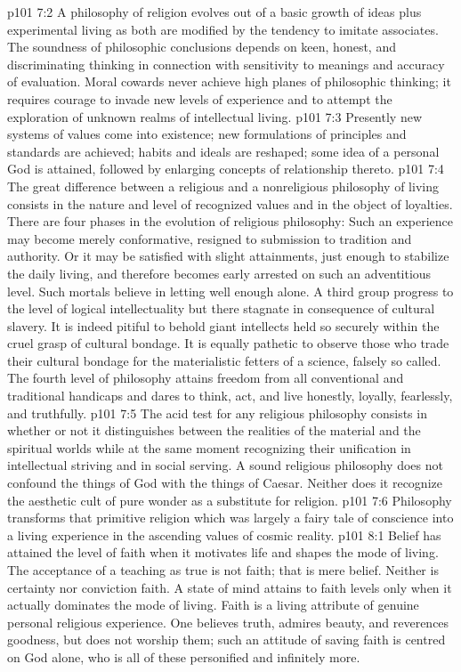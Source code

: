 \vs p101 7:2 A philosophy of religion evolves out of a basic growth of ideas plus experimental living as both are modified by the tendency to imitate associates. The soundness of philosophic conclusions depends on keen, honest, and discriminating thinking in connection with sensitivity to meanings and accuracy of evaluation. Moral cowards never achieve high planes of philosophic thinking; it requires courage to invade new levels of experience and to attempt the exploration of unknown realms of intellectual living.
\vs p101 7:3 Presently new systems of values come into existence; new formulations of principles and standards are achieved; habits and ideals are reshaped; some idea of a personal God is attained, followed by enlarging concepts of relationship thereto.
\vs p101 7:4 \pc The great difference between a religious and a nonreligious philosophy of living consists in the nature and level of recognized values and in the object of loyalties. There are four phases in the evolution of religious philosophy: Such an experience may become merely conformative, resigned to submission to tradition and authority. Or it may be satisfied with slight attainments, just enough to stabilize the daily living, and therefore becomes early arrested on such an adventitious level. Such mortals believe in letting well enough alone. A third group progress to the level of logical intellectuality but there stagnate in consequence of cultural slavery. It is indeed pitiful to behold giant intellects held so securely within the cruel grasp of cultural bondage. It is equally pathetic to observe those who trade their cultural bondage for the materialistic fetters of a science, falsely so called. The fourth level of philosophy attains freedom from all conventional and traditional handicaps and dares to think, act, and live honestly, loyally, fearlessly, and truthfully.
\vs p101 7:5 The acid test for any religious philosophy consists in whether or not it distinguishes between the realities of the material and the spiritual worlds while at the same moment recognizing their unification in intellectual striving and in social serving. A sound religious philosophy does not confound the things of God with the things of Caesar. Neither does it recognize the aesthetic cult of pure wonder as a substitute for religion.
\vs p101 7:6 Philosophy transforms that primitive religion which was largely a fairy tale of conscience into a living experience in the ascending values of cosmic reality.
\vs p101 8:1 Belief has attained the level of faith when it motivates life and shapes the mode of living. The acceptance of a teaching as true is not faith; that is mere belief. Neither is certainty nor conviction faith. A state of mind attains to faith levels only when it actually dominates the mode of living. Faith is a living attribute of genuine personal religious experience. One believes truth, admires beauty, and reverences goodness, but does not worship them; such an attitude of saving faith is centred on God alone, who is all of these personified and infinitely more.
